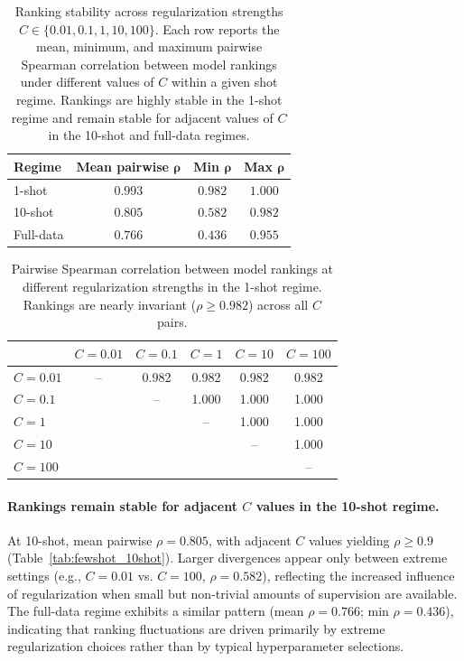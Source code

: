 \documentclass{llmxive}
\begin{document}
\begin{table}[!htbp]
\centering
\small
\begin{tabular}{@{}lccc@{}}
\toprule
\textbf{Regime} & \textbf{Mean pairwise} $\boldsymbol{\rho}$ & \textbf{Min} $\boldsymbol{\rho}$ & \textbf{Max} $\boldsymbol{\rho}$ \\
\midrule
1-shot     & $0.993$ & $0.982$ & $1.000$ \\
10-shot    & $0.805$ & $0.582$ & $0.982$ \\
Full-data  & $0.766$ & $0.436$ & $0.955$ \\
\bottomrule
\end{tabular}
\caption{Ranking stability across regularization strengths
$C \in \{0.01, 0.1, 1, 10, 100\}$. Each row reports the mean, minimum,
and maximum pairwise Spearman correlation between model rankings under
different values of $C$ within a given shot regime. Rankings are highly
stable in the 1-shot regime and remain stable for adjacent values of
$C$ in the 10-shot and full-data regimes.}
\label{tab:fewshot_summary}
\end{table}

\begin{table}[!htbp]
\centering
\small
\begin{tabular}{@{}lccccc@{}}
\toprule
 & $C=0.01$ & $C=0.1$ & $C=1$ & $C=10$ & $C=100$ \\
\midrule
$C=0.01$  &  --    & 0.982 & 0.982 & 0.982 & 0.982 \\
$C=0.1$   &       &  --    & 1.000 & 1.000 & 1.000 \\
$C=1$     &       &       &  --    & 1.000 & 1.000 \\
$C=10$    &       &       &       &  --    & 1.000 \\
$C=100$   &       &       &       &       &  --    \\
\bottomrule
\end{tabular}
\caption{Pairwise Spearman correlation between model rankings at
different regularization strengths in the 1-shot regime. Rankings are
nearly invariant ($\rho \geq 0.982$) across all $C$ pairs.}
\label{tab:fewshot_1shot}
\end{table}

\paragraph{Rankings remain stable for adjacent \texorpdfstring{$C$}{C} values in the 10-shot regime.}
At 10-shot, mean pairwise $\rho = 0.805$, with adjacent $C$ values
yielding $\rho \geq 0.9$ (Table~\ref{tab:fewshot_10shot}). Larger
divergences appear only between extreme settings (e.g., $C = 0.01$ vs.
$C = 100$, $\rho = 0.582$), reflecting the increased influence of
regularization when small but non-trivial amounts of supervision are
available. The full-data regime exhibits a similar pattern (mean
$\rho = 0.766$; min $\rho = 0.436$), indicating that ranking
fluctuations are driven primarily by extreme regularization choices
rather than by typical hyperparameter selections.
\end{document}
